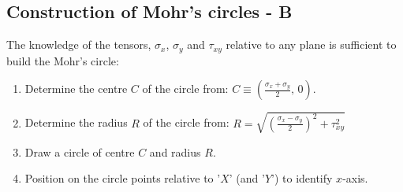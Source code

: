 \documentclass[class=report, crop=false, 12pt,a4paper]{standalone}
\begin{document}
\subsection{Construction of Mohr's circles - B}
The knowledge of the tensors, $\sigma_x$, $\sigma_y$ and $\tau_{xy}$ relative to any plane is sufficient to build the Mohr's circle:
\begin{enumerate}
    \item Determine the centre $C$ of the circle from: $C \equiv \left(\frac{\sigma_x + \sigma_y}{2}, \, 0\right)$.
    \item Determine the radius $R$ of the circle from: $R = \sqrt{\left(\frac{\sigma_x - \sigma_y}{2}\right)^2 + \tau^2_{xy}}$
    \item Draw a circle of centre $C$ and radius $R$.
    \item Position on the circle points relative to '$X$' (and '$Y$') to identify $x$-axis.
\end{enumerate}
\end{document}

